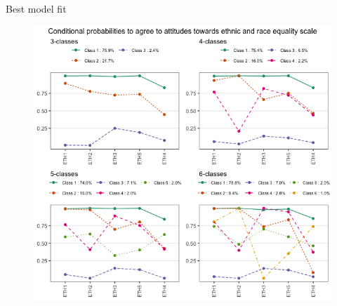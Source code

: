 \documentclass[11pt,t]{beamer}
\begin{document}
\begin{frame}{Best model fit}
\vspace{-5.5mm} 
\begin{figure}
	\centering
	\includegraphics[height=0.63\textwidth]{graphics/ethnicclasses.png}
\end{figure}

\end{frame} 
\end{document}
